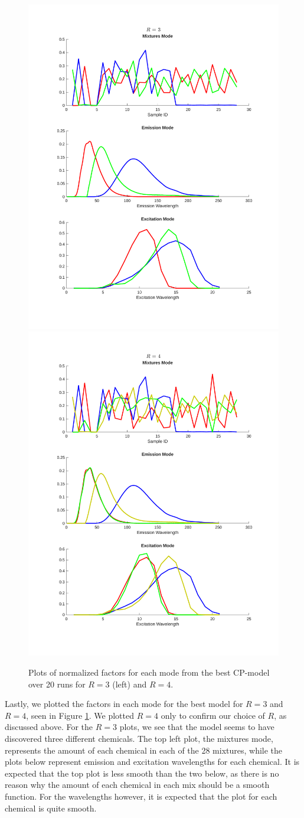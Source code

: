 \begin{figure}[H]
    \centering
    \includegraphics[trim = 2cm 2.5cm 2cm 1.9cm, clip, width=0.46\linewidth]{figures/factors_rank3.pdf}
    \includegraphics[trim = 2cm 2.5cm 2cm 1.9cm, clip, width=0.46\linewidth]{figures/factors_rank4.pdf}
    \caption{Plots of normalized factors for each mode from the best CP-model over 20 runs for $R=3$ (left) and $R=4$.}
    \label{fig:plot_factors}
\end{figure}

Lastly, we plotted the factors in each mode for the best model for $R=3$ and $R=4$, seen in Figure \ref{fig:plot_factors}.
We plotted $R=4$ only to confirm our choice of $R$, as discussed above.
For the $R=3$ plots, we see that the model seems to have discovered three different chemicals.
The top left plot, the mixtures mode, represents the amount of each chemical in each of the 28 mixtures, while the plots below represent emission and excitation wavelengths for each chemical.
It is expected that the top plot is less smooth than the two below, as there is no reason why the amount of each chemical in each mix should be a smooth function.
For the wavelengths however, it is expected that the plot for each chemical is quite smooth.
